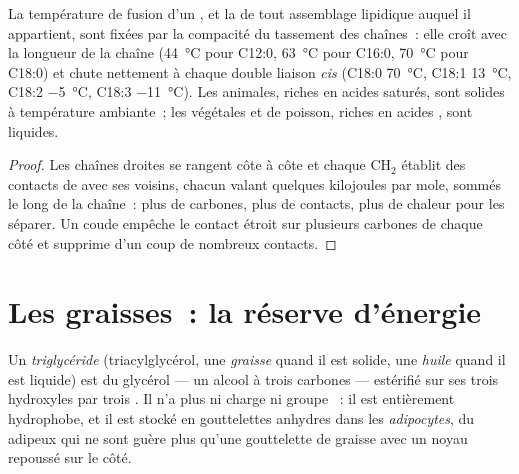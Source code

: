 \begin{proposition}\label{prop:b1:lipids:melting}
La température de fusion d'un , et la  de tout
assemblage lipidique auquel il appartient, sont fixées par la
compacité du tassement des chaînes~: elle croît avec la longueur de la
chaîne (\qty{44}{\celsius} pour C12:0, \qty{63}{\celsius} pour C16:0,
\qty{70}{\celsius} pour C18:0) et chute nettement à chaque double
liaison \emph{cis} (C18:0 \qty{70}{\celsius}, C18:1 \qty{13}{\celsius},
C18:2 \qty{-5}{\celsius}, C18:3 \qty{-11}{\celsius}). Les 
animales, riches en acides saturés, sont solides à température
ambiante~; les  végétales et de poisson, riches en acides
, sont liquides.
\end{proposition}
\begin{proof}
Les chaînes droites se rangent côte à côte et chaque $\mathrm{CH_2}$
établit des contacts de  avec ses voisins, chacun valant
quelques kilojoules par mole, sommés le long de la chaîne~: plus de
carbones, plus de contacts, plus de chaleur pour les séparer. Un coude
empêche le contact étroit sur plusieurs carbones de chaque côté et
supprime d'un coup de nombreux contacts.
\end{proof}

\section{Les graisses~: la réserve d'énergie}

\begin{definition}[Triglycéride]\label{def:b1:lipids:triglyceride}
Un \emph{triglycéride} (triacylglycérol, une
\emph{graisse} quand il est solide, une
\emph{huile} quand il est liquide) est du glycérol --- un
alcool à trois carbones --- estérifié sur ses trois hydroxyles par trois
. Il n'a plus ni charge ni groupe ~: il est
entièrement hydrophobe, et il est stocké en gouttelettes anhydres dans
les \emph{adipocytes},  du  adipeux qui ne
sont guère plus qu'une gouttelette de graisse avec un noyau repoussé sur
le côté.
\end{definition}

